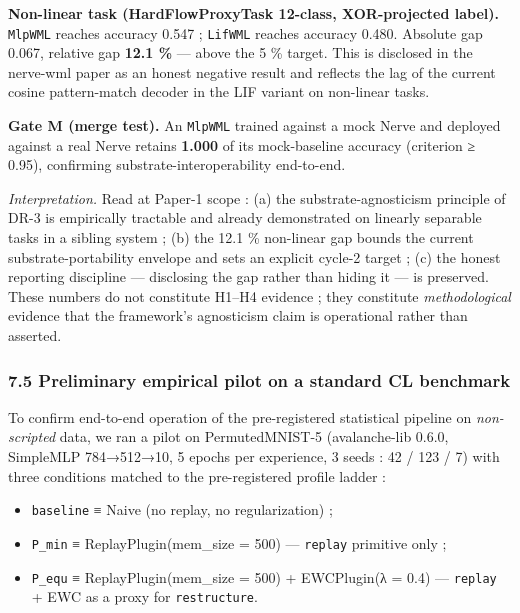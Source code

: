 \documentclass[
]{article}
\providecommand{\tightlist}{%
  \setlength{\itemsep}{0pt}\setlength{\parskip}{0pt}}
\begin{document}
\textbf{Non-linear task (HardFlowProxyTask 12-class, XOR-projected
label).} \texttt{MlpWML} reaches accuracy 0.547 ; \texttt{LifWML}
reaches accuracy 0.480. Absolute gap 0.067, relative gap \textbf{12.1
\%} --- above the 5 \% target. This is disclosed in the nerve-wml paper
as an honest negative result and reflects the lag of the current cosine
pattern-match decoder in the LIF variant on non-linear tasks.

\textbf{Gate M (merge test).} An \texttt{MlpWML} trained against a mock
Nerve and deployed against a real Nerve retains \textbf{1.000} of its
mock-baseline accuracy (criterion ≥ 0.95), confirming
substrate-interoperability end-to-end.

\emph{Interpretation.} Read at Paper-1 scope : (a) the
substrate-agnosticism principle of DR-3 is empirically tractable and
already demonstrated on linearly separable tasks in a sibling system ;
(b) the 12.1 \% non-linear gap bounds the current substrate-portability
envelope and sets an explicit cycle-2 target ; (c) the honest reporting
discipline --- disclosing the gap rather than hiding it --- is
preserved. These numbers do not constitute H1--H4 evidence ; they
constitute \emph{methodological} evidence that the framework's
agnosticism claim is operational rather than asserted.

\subsubsection{7.5 Preliminary empirical pilot on a standard CL
benchmark}\label{preliminary-empirical-pilot-on-a-standard-cl-benchmark}

To confirm end-to-end operation of the pre-registered statistical
pipeline on \emph{non-scripted} data, we ran a pilot on PermutedMNIST-5
(avalanche-lib 0.6.0, SimpleMLP 784→512→10, 5 epochs per experience, 3
seeds : 42 / 123 / 7) with three conditions matched to the
pre-registered profile ladder :

\begin{itemize}
\tightlist
\item
  \texttt{baseline} ≡ Naive (no replay, no regularization) ;
\item
  \texttt{P\_min} ≡ ReplayPlugin(mem\_size = 500) --- \texttt{replay}
  primitive only ;
\item
  \texttt{P\_equ} ≡ ReplayPlugin(mem\_size = 500) + EWCPlugin(λ = 0.4)
  --- \texttt{replay} + EWC as a proxy for \texttt{restructure}.
\end{itemize}
\end{document}
